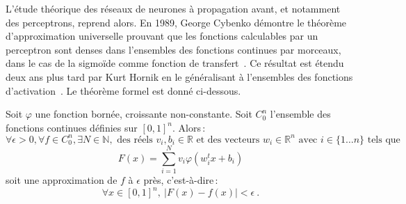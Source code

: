 L'étude théorique des réseaux de neurones à propagation avant, et notamment des perceptrons, reprend alors. En 1989, George Cybenko démontre le théorème d'approximation universelle prouvant que les fonctions calculables par un perceptron sont denses dans l'ensembles des fonctions continues par morceaux, dans le cas de la sigmoïde comme fonction de transfert~\cite{cybenko_approximation_1989}. Ce résultat est étendu deux ans plus tard par Kurt Hornik en le généralisant à l'ensembles des fonctions d'activation~\cite{hornik_approximation_1991}. Le théorème formel est donné ci-dessous.

\begin{theorem}
Soit $\varphi$ une fonction bornée, croissante non-constante. Soit $C_0^n$ l'ensemble des fonctions continues définies sur $[0,1]^n$. Alors\,:
$$\forall \epsilon > 0, \forall f \in C_0^n, \exists N \in \mathbb{N}, \text{ des réels } v_i, b_i \in \mathbb{R} \text{ et des vecteurs } w_i \in \mathbb{R}^n \text{ avec } i \in \{1\dots{}n\} \text{ tels que}$$
$$F(x) = \sum_{i=1}^N v_i \varphi\left(w_i^t x + b_i \right)$$
soit une approximation de $f$ à $\epsilon$ près, c'est-à-dire\,:
$$\forall x \in [0,1]^n, ~\left| F(x) -f(x) \right| < \epsilon~.$$
\end{theorem}

